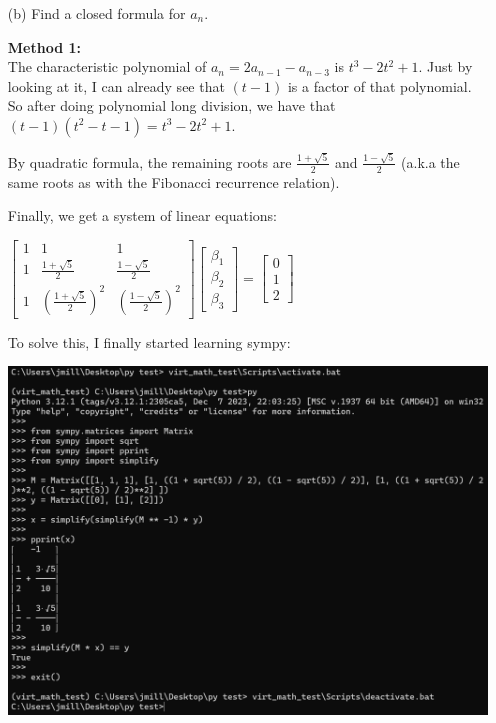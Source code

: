 \documentclass{book}
\newcommand{\exOne}{%
   \color{Purple}%
   \fontsize{13}{15}\selectfont%
}
\newenvironment{myIndent}{%
   \begin{adjustwidth}{2.5em}{0em}%
}{%
   \end{adjustwidth}%
}
\newcommand{\blab}[1]{\textbf{#1}}
\newcommand{\retTwo}{\hfill\bigbreak}
\begin{document}
\begin{itemize}
   \item[(b)] Find a closed formula for $a_n$. 
   
   \begin{myIndent}\exOne
      \blab{Method 1:}\\
      The characteristic polynomial of $a_n = 2a_{n-1} - a_{n-3}$ is $t^3 - 2t^2 + 1$. Just by looking at it, I can already see that $(t - 1)$ is a factor of that polynomial. So after doing polynomial long division, we have that $(t - 1)(t^2 - t - 1) = t^3 - 2t^2 + 1$.\retTwo

      By quadratic formula, the remaining roots are $\frac{1 + \sqrt{5}}{2}$ and $\frac{1 - \sqrt{5}}{2}$ (a.k.a the same roots as with the Fibonacci recurrence relation).\retTwo

      Finally, we get a system of linear equations:
      
      {\centering$
      \begin{bmatrix}
         1 & 1 & 1 \\ 1 & \frac{1 + \sqrt{5}}{2} & \frac{1 - \sqrt{5}}{2} \\  1 & \left(\frac{1 + \sqrt{5}}{2}\right)^2 & \left(\frac{1 - \sqrt{5}}{2}\right)^2
      \end{bmatrix}
      \begin{bmatrix}
         \beta_1 \\ \beta_2 \\ \beta_3
      \end{bmatrix} = 
      \begin{bmatrix}
         0 \\ 1 \\ 2
      \end{bmatrix}$\retTwo\par}

      To solve this, I finally started learning sympy:

      {\centering\includegraphics[scale=0.58]{188-HW1_Q3.png}\newpage\par}


\end{myIndent}
\end{itemize}
\end{document}

